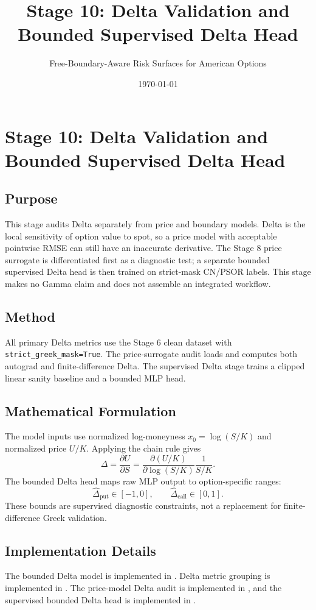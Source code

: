 \documentclass[11pt]{article}
\title{Stage 10: Delta Validation and Bounded Supervised Delta Head}
\author{Free-Boundary-Aware Risk Surfaces for American Options}
\date{\today}
\begin{document}
\maketitle

\section{Stage 10: Delta Validation and Bounded Supervised Delta Head}

\subsection{Purpose}
This stage audits Delta separately from price and boundary models. Delta is the
local sensitivity of option value to spot, so a price model with acceptable
pointwise RMSE can still have an inaccurate derivative. The Stage 8 price
surrogate is differentiated first as a diagnostic test; a separate bounded
supervised Delta head is then trained on strict-mask CN/PSOR labels. This stage
makes no Gamma claim and does not assemble an integrated workflow.

\subsection{Method}
All primary Delta metrics use the Stage 6 clean dataset with \texttt{strict\_greek\_mask=True}. The price-surrogate audit loads  and computes both autograd and finite-difference Delta. The supervised Delta stage trains a clipped linear sanity baseline and a bounded MLP head.

\subsection{Mathematical Formulation}
The model inputs use normalized log-moneyness \(x_0=\log(S/K)\) and normalized
price \(U/K\). Applying the chain rule gives
\[
\Delta = \frac{\partial U}{\partial S}
       = \frac{\partial (U/K)}{\partial \log(S/K)} \frac{1}{S/K}.
\]
The bounded Delta head maps raw MLP output to option-specific ranges:
\[
\widehat{\Delta}_{\mathrm{put}}\in[-1,0], \qquad
\widehat{\Delta}_{\mathrm{call}}\in[0,1].
\]
These bounds are supervised diagnostic constraints, not a replacement for finite-difference Greek validation.

\subsection{Implementation Details}
The bounded Delta model is implemented in . Delta metric grouping is implemented in . The price-model Delta audit is implemented in , and the supervised bounded Delta head is implemented in .
\end{document}
